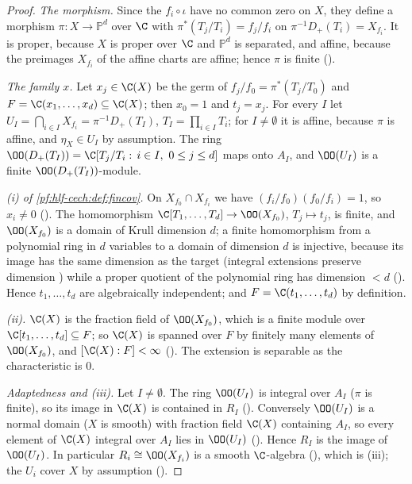 \begin{proof}
\emph{The morphism.} Since the $f_i\circ\iota$ have no common zero on $X$, they define a morphism $\pi\colon X\to\mathbb P^d$ over $\C$ with
$\pi^*(T_j/T_i)=f_j/f_i$ on $\pi^{-1}D_+(T_i)=X_{f_i}$. It is proper, because $X$ is proper over $\C$ and $\mathbb P^d$ is separated, and affine,
because the preimages $X_{f_i}$ of the affine charts are affine; hence $\pi$ is finite \cite[Tag~01WN]{Stacks2024}
().

\emph{The family $x$.} Let $x_j\in\C(X)$ be the germ of $f_j/f_0=\pi^*(T_j/T_0)$ and $F=\C(x_1,\dots,x_d)\subseteq\C(X)$; then $x_0=1$ and
$t_j=x_j$. For every $I$ let $U_I=\bigcap_{i\in I}X_{f_i}=\pi^{-1}D_+(T_I)$, $T_I=\prod_{i\in I}T_i$; for $I\ne\emptyset$ it is affine, because $\pi$ is
affine, and $\eta_X\in U_I$ by assumption. The ring $\OO(D_+(T_I))=\C[T_j/T_i:\,i\in I,\ 0\le j\le d]$ maps onto $A_I$, and $\OO(U_I)$ is a finite
$\OO(D_+(T_I))$-module.

\emph{(i) of \cref{pf:hlf-cech:def:fincov}.} On $X_{f_0}\cap X_{f_i}$ we have $(f_i/f_0)(f_0/f_i)=1$, so $x_i\ne0$
(). The homomorphism $\C[T_1,\dots,T_d]\to\OO(X_{f_0})$, $T_j\mapsto t_j$, is
finite, and $\OO(X_{f_0})$ is a domain of Krull dimension $d$; a finite homomorphism from a polynomial ring in $d$ variables to a domain of
dimension $d$ is injective, because its image has the same dimension as the target (integral extensions preserve dimension
\cite[Ch.~5]{AtiyahMacdonald1969}) while a proper quotient of the polynomial ring has dimension $<d$
(). Hence $t_1,\dots,t_d$ are algebraically independent; and
$F=\C(t_1,\dots,t_d)$ by definition.

\emph{(ii).} $\C(X)$ is the fraction field of $\OO(X_{f_0})$, which is a finite module over $\C[t_1,\dots,t_d]\subseteq F$; so $\C(X)$ is spanned over
$F$ by finitely many elements of $\OO(X_{f_0})$, and $[\C(X):F]<\infty$ (). The
extension is separable as the characteristic is $0$.

\emph{Adaptedness and (iii).} Let $I\ne\emptyset$. The ring $\OO(U_I)$ is integral over $A_I$ ($\pi$ is finite), so its image in $\C(X)$ is contained in
$R_I$ (). Conversely $\OO(U_I)$ is a normal domain ($X$ is smooth) with
fraction field $\C(X)$ containing $A_I$, so every element of $\C(X)$ integral over $A_I$ lies in $\OO(U_I)$
(). Hence $R_I$ is the image of $\OO(U_I)$. In particular $R_i\cong\OO(X_{f_i})$ is a smooth
$\C$-algebra (), which is (iii); the $U_i$ cover $X$ by assumption
().
\end{proof}

